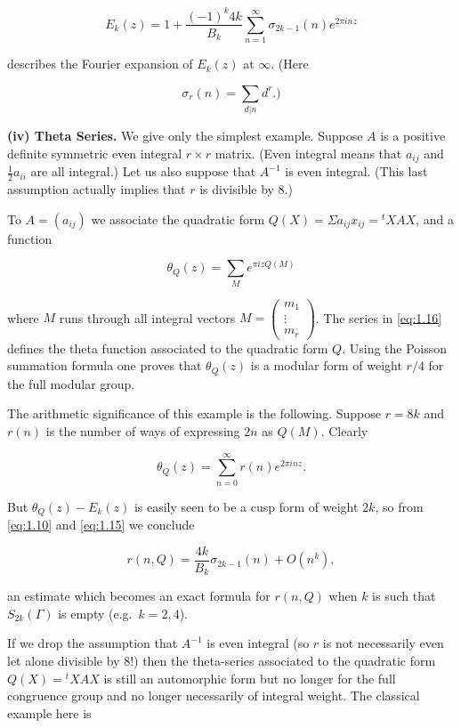 \begin{equation}\label{eq:1.15}
E_k(z) = 1 + \frac{(-1)^k 4k}{B_k} \sum_{n=1}^{\infty} \sigma_{2k-1}(n) e^{2\pi inz}\tag{1.15}
\end{equation}

describes the Fourier expansion of $E_k(z)$ at $\infty$. (Here

\[
\sigma_r(n) = \sum_{d|n} d^r.)
\]

\textbf{(iv) Theta Series.} We give only the simplest example. Suppose $A$ is a positive definite symmetric even integral $r \times r$ matrix. (Even integral means that $a_{ij}$ and $\frac{1}{2}a_{ii}$ are all integral.) Let us also suppose that $A^{-1}$ is even integral. (This last assumption actually implies that $r$ is divisible by 8.)

To $A = (a_{ij})$ we associate the quadratic form $Q(X) = \Sigma a_{ij}x_{ij} = {}^{t}XAX$, and a function

\begin{equation}\label{eq:1.16}
\theta_Q(z) = \sum_M e^{\pi izQ(M)}\tag{1.16}
\end{equation}

where $M$ runs through all integral vectors $M = \begin{pmatrix} m_1 \\ \vdots \\ m_r \end{pmatrix}$. The series in \eqref{eq:1.16} defines the theta function associated to the quadratic form $Q$. Using the Poisson summation formula one proves that $\theta_Q(z)$ is a modular form of weight $r/4$ for the full modular group.

The arithmetic significance of this example is the following. Suppose $r = 8k$ and $r(n)$ is the number of ways of expressing $2n$ as $Q(M)$. Clearly

\[
\theta_Q(z) = \sum_{n=0}^{\infty} r(n) e^{2\pi inz}.
\]

But $\theta_Q(z) - E_k(z)$ is easily seen to be a cusp form of weight $2k$, so from \eqref{eq:1.10} and \eqref{eq:1.15} we conclude

\[
r(n,Q) = \frac{4k}{B_k} \sigma_{2k-1}(n) + O(n^k),
\]

an estimate which becomes an exact formula for $r(n,Q)$ when $k$ is such that $S_{2k}(\Gamma)$ is empty (e.g.\ $k = 2, 4$).

If we drop the assumption that $A^{-1}$ is even integral (so $r$ is not necessarily even let alone divisible by 8!) then the theta-series associated to the quadratic form $Q(X) = {}^{t}XAX$ is still an automorphic form but no longer for the full congruence group and no longer necessarily of integral weight. The classical example here is

